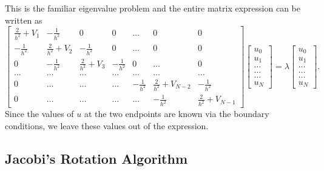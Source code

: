 \documentclass[%
oneside,                 %
final,                   %
10pt]{article}
\begin{document}
This is the familiar eigenvalue problem and the entire matrix expression can be written as
\begin{equation}
 \begin{bmatrix} \frac{2}{h^2}+V_1 & -\frac{1}{h^2} & 0   & 0    & \dots  &0     & 0 \\
                                -\frac{1}{h^2} & \frac{2}{h^2}+V_2 & -\frac{1}{h^2} & 0    & \dots  &0     &0 \\
                                0   & -\frac{1}{h^2} & \frac{2}{h^2}+V_3 & -\frac{1}{h^2}  &0       &\dots & 0\\
                                \dots  & \dots & \dots & \dots  &\dots      &\dots & \dots\\
                                0   & \dots & \dots & \dots  &-\frac{1}{h^2}  &\frac{2}{h^2}+V_{N-2} & -\frac{1}{h^2}\\
                                0   & \dots & \dots & \dots  &\dots       &-\frac{1}{h^2} & \frac{2}{h^2}+V_{N-1}
             \end{bmatrix}  \begin{bmatrix} u_{0} \\
                                                              u_{1} \\
                                                              \dots\\ \dots\\ \dots\\
                                                              u_{N}
             \end{bmatrix}=\lambda \begin{bmatrix} u_{0} \\
                                                              u_{1} \\
                                                              \dots\\ \dots\\ \dots\\
                                                              u_{N}
             \end{bmatrix}.  
      \label{eq:sematrix}
\end{equation}
Since the values of $u$ at the two endpoints are known via the boundary conditions, we leave these values out of the expression.

\subsection{Jacobi's Rotation Algorithm}
\end{document}
